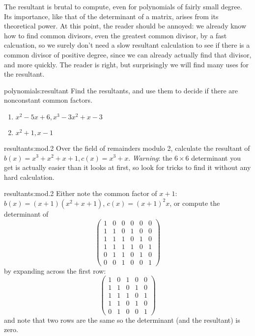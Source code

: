 The resultant is brutal to compute, even for polynomials of fairly small degree.
Its importance, like that of the determinant of a matrix, arises from its theoretical power.
At this point, the reader should be annoyed: we already know how to find common divisors, even the greatest common divisor, by a fast calcuation, so we surely don't need a slow resultant calculation to see if there is a common divisor of positive degree, since we can already actually find that divisor, and more quickly.
The reader is right, but surprisingly we will find many uses for the resultant.
\begin{problem}{polynomials:resultant}
Find the resultants, and use them to decide if there are nonconstant common factors.
\begin{enumerate}
\item \(x^2-5x+6, x^3-3x^2+x-3\)
\item \(x^2+1,x-1\)
\end{enumerate} 
\end{problem}
\begin{problem}{resultants:mod.2}
Over the field of remainders modulo 2, calculate the resultant of \(b(x)=x^3+x^2+x+1, c(x)=x^3+x\).
\emph{Warning}: the \(6 \times 6\) determinant you get is actually easier than it looks at first, so look for tricks to find it without any hard calculation.
\end{problem}
\begin{answer}{resultants:mod.2}
Either note the common factor of \(x+1\): \(b(x)=(x+1)(x^2+x+1)\), \(c(x)=(x+1)^2x\), or compute the determinant of 
\[
\begin{pmatrix}
1&0&0&0&0&0\\
1&1&0&1&0&0\\
1&1&1&0&1&0\\
1&1&1&1&0&1\\
0&1&1&0&1&0\\
0&0&1&0&0&1
\end{pmatrix}
\]
by expanding across the first row:
\[
\begin{pmatrix}
1&0&1&0&0\\
1&1&0&1&0\\
1&1&1&0&1\\
1&1&0&1&0\\
0&1&0&0&1
\end{pmatrix}
\]
and note that two rows are the same so the determinant (and the resultant) is zero.
\end{answer}

